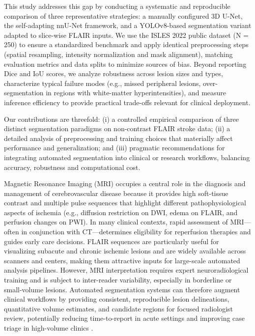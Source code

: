 \documentclass[12pt]{article}
\begin{document}
This study addresses this gap by conducting a systematic and reproducible comparison of three representative strategies: a manually configured 3D U-Net, the self-adapting nnU-Net framework, and a YOLOv8-based segmentation variant adapted to slice-wise FLAIR inputs. We use the ISLES 2022 public dataset (N = 250) to ensure a standardized benchmark and apply identical preprocessing steps (spatial resampling, intensity normalization and mask alignment), matching evaluation metrics and data splits to minimize sources of bias. Beyond reporting Dice and IoU scores, we analyze robustness across lesion sizes and types, characterize typical failure modes (e.g., missed peripheral lesions, over-segmentation in regions with white-matter hyperintensities), and measure inference efficiency to provide practical trade-offs relevant for clinical deployment.

Our contributions are threefold: (i) a controlled empirical comparison of three distinct segmentation paradigms on non-contrast FLAIR stroke data; (ii) a detailed analysis of preprocessing and training choices that materially affect performance and generalization; and (iii) pragmatic recommendations for integrating automated segmentation into clinical or research workflows, balancing accuracy, robustness and computational cost.

Magnetic Resonance Imaging (MRI) occupies a central role in the diagnosis and management of cerebrovascular disease because it provides high soft-tissue contrast and multiple pulse sequences that highlight different pathophysiological aspects of ischemia (e.g., diffusion restriction on DWI, edema on FLAIR, and perfusion changes on PWI). In many clinical contexts, rapid assessment of MRI—often in conjunction with CT—determines eligibility for reperfusion therapies and guides early care decisions. FLAIR sequences are particularly useful for visualizing subacute and chronic ischemic lesions and are widely available across scanners and centers, making them attractive inputs for large-scale automated analysis pipelines. However, MRI interpretation requires expert neuroradiological training and is subject to inter-reader variability, especially in borderline or small-volume lesions. Automated segmentation systems can therefore augment clinical workflows by providing consistent, reproducible lesion delineations, quantitative volume estimates, and candidate regions for focused radiologist review, potentially reducing time-to-report in acute settings and improving case triage in high-volume clinics \cite{Litjens2017,Esteva2021}.
\end{document}
